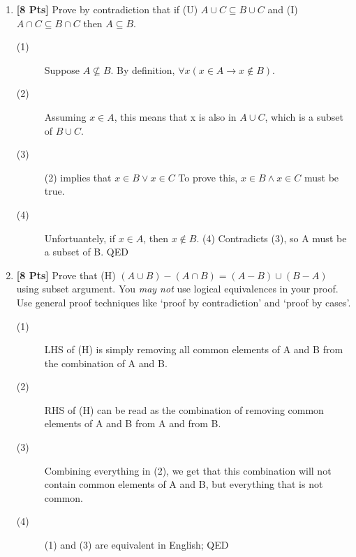 \documentclass[12pt]{article}
\begin{document}
\begin{enumerate}
        \item {\bf [8 Pts]} Prove by contradiction that if (U) $A \cup C \subseteq B \cup C$ and (I) $A \cap C \subseteq B \cap C$ then $A \subseteq B$.
            \begin{description}
                \item[(1)] Suppose $A \not\subseteq B$. By definition, $\forall x(x \in A \to x \not\in B)$.
                \item[(2)] Assuming $x \in A$, this means that x is also in $A \cup C$, which is a subset of $B \cup C$.
                \item[(3)] (2) implies that $x \in B \lor x \in C$ To prove this, $x \in B \land x \in C$ must be true.
                \item[(4)] Unfortuantely, if $x \in A$, then $x \not\in B$. (4) Contradicts (3), so A must be a subset of B. QED
            \end{description}
        \item {\bf [8 Pts]} Prove that (H) $(A \cup B) - (A \cap B) = (A - B) \cup (B - A)$ using subset argument. You {\it may not} use logical equivalences in your proof. Use general proof techniques like `proof by contradiction' and `proof by cases'.
            \begin{description}
                \item[(1)] LHS of (H) is simply removing all common elements of A and B from the combination of A and B.
                \item[(2)] RHS of (H) can be read as the combination of removing common elements of A and B from A and from B.
                \item[(3)] Combining everything in (2), we get that this combination will not contain common elements of A and B, but everything that is not common.
                \item[(4)] (1) and (3) are equivalent in English; QED
            \end{description}


\end{enumerate}
\end{document}

